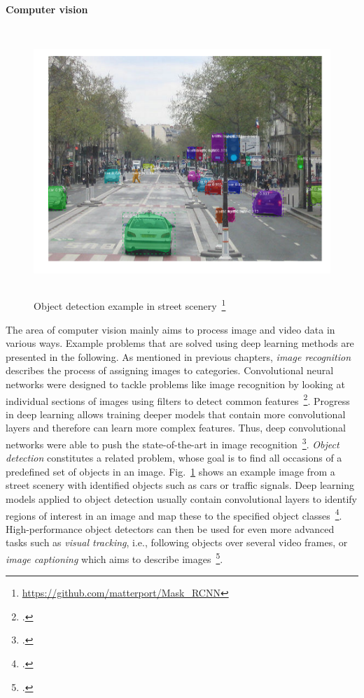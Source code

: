 \paragraph{Computer vision}
\label{sub:dl_app_cv}

\begin{figure}[h]
  \centering
  \includegraphics[height=10cm]{img/mask_rcnn}
  \caption[Object detection example]{Object detection example in street scenery~\footnote{\url{https://github.com/matterport/Mask_RCNN}}}
\label{fig:obj_detection}
\end{figure}

The area of computer vision mainly aims to process image and video data in
various ways.
Example problems that are solved using deep learning methods are presented in
the following.
As mentioned in previous chapters, \textit{image recognition} describes the
process of assigning images to categories.
Convolutional neural networks were designed to tackle problems like image
recognition by looking at individual sections of images using filters to
detect common features~\footcite{LeCun1998}.
Progress in deep learning allows training deeper models that contain more
convolutional layers and therefore can learn more complex features.
Thus, deep convolutional networks were able to push the state-of-the-art in image recognition~\footcite{Krizhevsky2012, He2016}.
\textit{Object detection} constitutes a related problem, whose goal is
to find all occasions of a predefined set of objects in an image.
Fig.~\ref{fig:obj_detection} shows an example image from a street scenery
with identified objects such as cars or traffic signals.
Deep learning models applied to object detection usually contain convolutional
layers to identify regions of interest in an image and map these to the
specified object classes~\footcite{Girshick2012, He2017}.
High-performance object detectors can then be used for even more advanced
tasks such as \textit{visual tracking}, i.e., following objects over several video
frames, or \textit{image captioning} which aims to describe images~\footcite{Bertinetto2016, Karpathy2017}.

